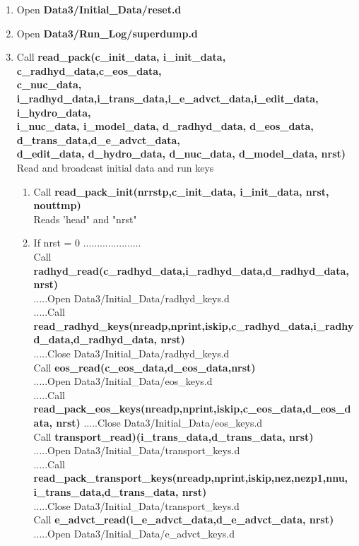 \documentclass[11pt,doublespace]{article}
\begin{document}
\begin{itemize}
\begin{enumerate}
\begin{enumerate}
\begin{enumerate}
  \item Open {\bf Data3/Initial\_Data/reset.d}
  \item Open {\bf Data3/Run\_Log/superdump.d}
  \item Call {\bf read\_pack(c\_init\_data, i\_init\_data, c\_radhyd\_data,c\_eos\_data,\\
c\_nuc\_data, i\_radhyd\_data,i\_trans\_data,i\_e\_advct\_data,i\_edit\_data, i\_hydro\_data,\\
i\_nuc\_data, i\_model\_data, d\_radhyd\_data, d\_eos\_data, d\_trans\_data,d\_e\_advct\_data,\\
d\_edit\_data, d\_hydro\_data, d\_nuc\_data, d\_model\_data, nrst)}\\
 Read and broadcast initial data and run keys
\begin{enumerate}
  \item Call {\bf read\_pack\_init(nrrstp,c\_init\_data, i\_init\_data, nrst, nouttmp)}\\
  Reads 'head" and "nrst"
  \item If nrst = 0 .....................\\
       Call {\bf radhyd\_read(c\_radhyd\_data,i\_radhyd\_data,d\_radhyd\_data, nrst)}\\
  .....Open Data3/Initial\_Data/radhyd\_keys.d\\
  .....Call {\bf read\_radhyd\_keys(nreadp,nprint,iskip,c\_radhyd\_data,i\_radhyd\_data,d\_radhyd\_data, nrst)}\\
  .....Close Data3/Initial\_Data/radhyd\_keys.d\\
  Call {\bf eos\_read(c\_eos\_data,d\_eos\_data,nrst)}\\
  .....Open Data3/Initial\_Data/eos\_keys.d\\
  .....Call {\bf read\_pack\_eos\_keys(nreadp,nprint,iskip,c\_eos\_data,d\_eos\_data, nrst)}
  .....Close Data3/Initial\_Data/eos\_keys.d\\
  Call {\bf transport\_read)(i\_trans\_data,d\_trans\_data, nrst)}\\
  .....Open Data3/Initial\_Data/transport\_keys.d\\
  .....Call {\bf read\_pack\_transport\_keys(nreadp,nprint,iskip,nez,nezp1,nnu,\\
   i\_trans\_data,d\_trans\_data, nrst)}\\
   .....Close Data3/Initial\_Data/transport\_keys.d\\
  Call {\bf e\_advct\_read(i\_e\_advct\_data,d\_e\_advct\_data, nrst)}\\
  .....Open Data3/Initial\_Data/e\_advct\_keys.d\\

\end{enumerate}
\end{enumerate}
\end{enumerate}
\end{enumerate}
\end{itemize}
\end{document}
